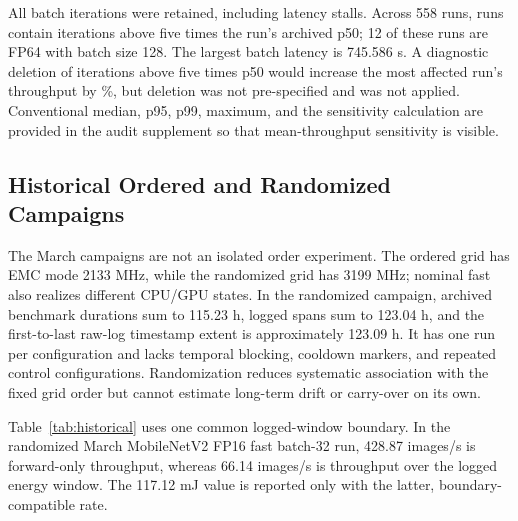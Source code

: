 \documentclass[electronics,article,submit,pdftex,moreauthors]{Definitions/mdpi}
\newcommand{\mobile}{MobileNetV2}
\renewcommand{\tabref}[1]{Table~\ref{#1}}
\begin{document}
All batch iterations were retained, including latency stalls. Across 558 runs, \RunsWithLargeStalls{} runs contain \LargeStallIterations{} iterations above five times the run's archived p50; 12 of these runs are FP64 with batch size 128. The largest batch latency is 745.586 s. A diagnostic deletion of iterations above five times p50 would increase the most affected run's throughput by \MaximumStallSensitivity{}\%, but deletion was not pre-specified and was not applied. Conventional median, p95, p99, maximum, and the sensitivity calculation are provided in the audit supplement so that mean-throughput sensitivity is visible.

\subsection{Historical Ordered and Randomized Campaigns}

The March campaigns are not an isolated order experiment. The ordered grid has EMC mode 2133 MHz, while the randomized grid has 3199 MHz; nominal fast also realizes different CPU/GPU states. In the randomized campaign, archived benchmark durations sum to 115.23 h, logged spans sum to 123.04 h, and the first-to-last raw-log timestamp extent is approximately 123.09 h. It has one run per configuration and lacks temporal blocking, cooldown markers, and repeated control configurations. Randomization reduces systematic association with the fixed grid order but cannot estimate long-term drift or carry-over on its own.

\tabref{tab:historical} uses one common logged-window boundary. In the randomized March \mobile{} FP16 fast batch-32 run, 428.87 images/s is forward-only throughput, whereas 66.14 images/s is throughput over the logged energy window. The 117.12 mJ value is reported only with the latter, boundary-compatible rate.
\end{document}

